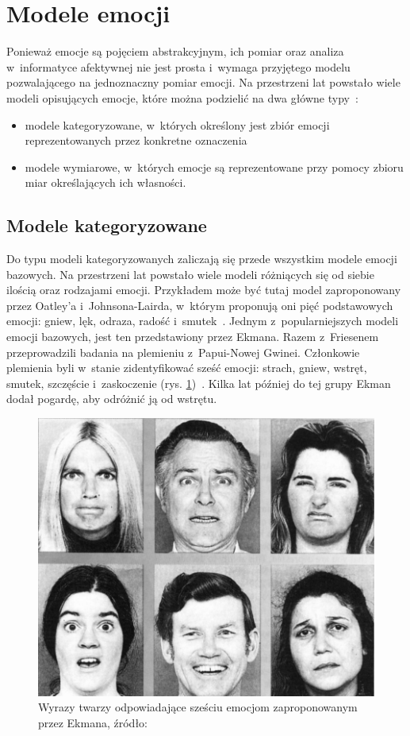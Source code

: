 \section{Modele emocji}
Ponieważ emocje są pojęciem abstrakcyjnym, ich pomiar oraz analiza w~informatyce afektywnej nie jest prosta i~wymaga przyjętego modelu pozwalającego na jednoznaczny pomiar emocji. Na przestrzeni lat powstało wiele modeli opisujących emocje, które można podzielić na dwa główne typy~\cite{emotion_models_review_2017}:
\begin{itemize}
	\item modele kategoryzowane, w~których określony jest zbiór emocji reprezentowanych przez konkretne oznaczenia
	\item modele wymiarowe, w~których emocje są reprezentowane przy pomocy zbioru miar określających ich własności.
\end{itemize}

\subsection{Modele kategoryzowane}
Do typu modeli kategoryzowanych zaliczają się przede wszystkim modele emocji bazowych. Na przestrzeni lat powstało wiele modeli różniących się od siebie ilością oraz rodzajami emocji. Przykładem może być tutaj model zaproponowany przez Oatley'a i~Johnsona-Lairda, w~którym proponują oni pięć podstawowych emocji: gniew, lęk, odraza, radość i~smutek~\cite{oatley_theory_of_emotions}. Jednym z~popularniejszych modeli emocji bazowych, jest ten przedstawiony przez Ekmana. Razem z~Friesenem przeprowadzili badania na plemieniu z~Papui-Nowej Gwinei. Członkowie plemienia byli w~stanie zidentyfikować sześć emocji: strach, gniew, wstręt, smutek, szczęście i~zaskoczenie (rys. \ref{fig:ekman_six_emotions})~\cite{Ekman1971ConstantsAC}. Kilka lat później do tej grupy Ekman dodał pogardę, aby odróżnić ją od wstrętu. 
\begin{figure}[h]
	\centering
	\includegraphics[width=0.6\linewidth]{images/ekman_six_basic_emotions.png}
	\caption{Wyrazy twarzy odpowiadające sześciu emocjom zaproponowanym przez Ekmana, źródło: \cite{Ekman1971ConstantsAC}}
	\label{fig:ekman_six_emotions}
\end{figure}

